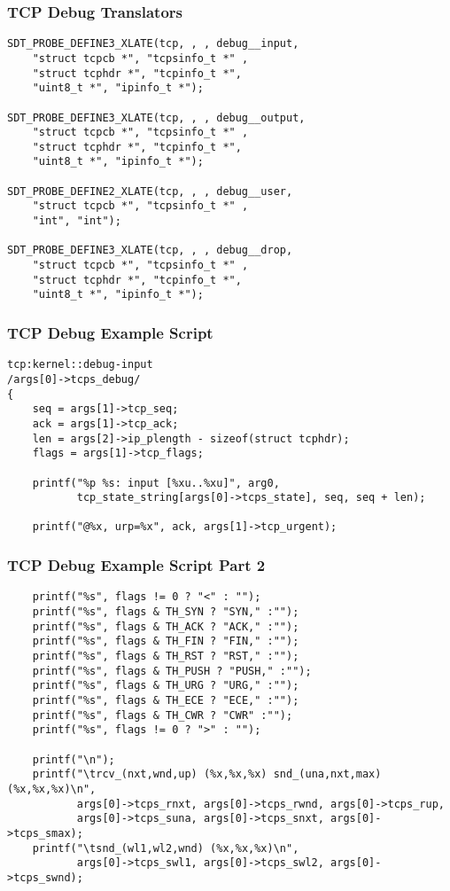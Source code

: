 \documentclass[pdftex]{beamer}
\begin{document}
\begin{frame}[fragile]
  \frametitle{TCP Debug Translators}
\begin{lstlisting}
SDT_PROBE_DEFINE3_XLATE(tcp, , , debug__input,
    "struct tcpcb *", "tcpsinfo_t *" ,
    "struct tcphdr *", "tcpinfo_t *",
    "uint8_t *", "ipinfo_t *");

SDT_PROBE_DEFINE3_XLATE(tcp, , , debug__output,
    "struct tcpcb *", "tcpsinfo_t *" ,
    "struct tcphdr *", "tcpinfo_t *",
    "uint8_t *", "ipinfo_t *");

SDT_PROBE_DEFINE2_XLATE(tcp, , , debug__user,
    "struct tcpcb *", "tcpsinfo_t *" ,
    "int", "int");

SDT_PROBE_DEFINE3_XLATE(tcp, , , debug__drop,
    "struct tcpcb *", "tcpsinfo_t *" ,
    "struct tcphdr *", "tcpinfo_t *",
    "uint8_t *", "ipinfo_t *");
\end{lstlisting}
\end{frame}

\begin{frame}[fragile]
  \frametitle{TCP Debug Example Script}
\begin{lstlisting}
tcp:kernel::debug-input
/args[0]->tcps_debug/
{
	seq = args[1]->tcp_seq;
	ack = args[1]->tcp_ack;
	len = args[2]->ip_plength - sizeof(struct tcphdr);
	flags = args[1]->tcp_flags;
	
	printf("%p %s: input [%xu..%xu]", arg0,
	       tcp_state_string[args[0]->tcps_state], seq, seq + len);

	printf("@%x, urp=%x", ack, args[1]->tcp_urgent);
\end{lstlisting}
\end{frame}

\begin{frame}[fragile]
  \frametitle{TCP Debug Example Script Part 2}
\begin{lstlisting}
	printf("%s", flags != 0 ? "<" : "");
	printf("%s", flags & TH_SYN ? "SYN," :"");
	printf("%s", flags & TH_ACK ? "ACK," :"");
	printf("%s", flags & TH_FIN ? "FIN," :"");
	printf("%s", flags & TH_RST ? "RST," :"");
	printf("%s", flags & TH_PUSH ? "PUSH," :"");
	printf("%s", flags & TH_URG ? "URG," :"");
	printf("%s", flags & TH_ECE ? "ECE," :"");
	printf("%s", flags & TH_CWR ? "CWR" :"");
	printf("%s", flags != 0 ? ">" : "");

	printf("\n");
	printf("\trcv_(nxt,wnd,up) (%x,%x,%x) snd_(una,nxt,max) (%x,%x,%x)\n",
	       args[0]->tcps_rnxt, args[0]->tcps_rwnd, args[0]->tcps_rup,
	       args[0]->tcps_suna, args[0]->tcps_snxt, args[0]->tcps_smax);
	printf("\tsnd_(wl1,wl2,wnd) (%x,%x,%x)\n",
	       args[0]->tcps_swl1, args[0]->tcps_swl2, args[0]->tcps_swnd);
\end{lstlisting}
\end{frame}
\end{document}
